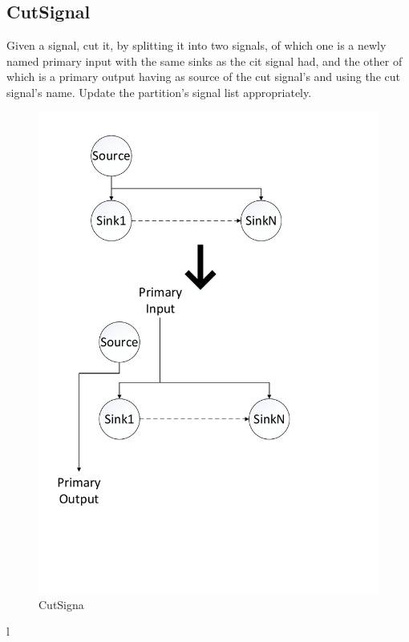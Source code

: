 \documentclass[12pt,final,oneside]{dwThesis} %
\begin{document}
   \newpage \subsection{CutSignal}\label{cutsignal} Given a signal, cut it, by
   splitting it into two signals, of which one is a newly named primary input
   with the same sinks as the cit signal had, and the other of which is a
   primary output having as source of the cut signal's and using the cut
   signal's name. Update the partition's signal list appropriately.
   
    \begin{figure} \begin{center}
         \includegraphics[width=\linewidth]{images/CutSignal.pdf}
         \caption{CutSigna} \label{imCutSignal} \end{center} \end{figure}
   l \newpage
\end{document}
